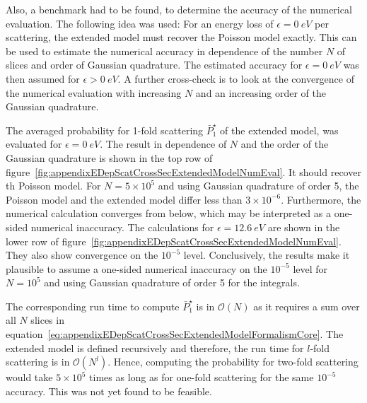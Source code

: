 Also, a benchmark had to be found, to determine the accuracy of the numerical evaluation. The following idea was used: For an energy loss of $\epsilon=\SI{0}{eV}$ per scattering, the extended model must recover the Poisson model exactly. This can be used to estimate the numerical accuracy in dependence of the number $N$ of slices and order of Gaussian quadrature. The estimated accuracy for $\epsilon=\SI{0}{eV}$ was then assumed for $\epsilon>\SI{0}{eV}$. A further cross-check is to look at the convergence of the numerical evaluation with increasing $N$ and an increasing order of the Gaussian quadrature.

The averaged probability for 1-fold scattering $\bar{P}^{\star}_1$ of the extended model, was evaluated for $\epsilon=\SI{0}{eV}$. The result in dependence of $N$ and the order of the Gaussian quadrature is shown in the top row of figure~\ref{fig:appendixEDepScatCrossSecExtendedModelNumEval}. It should recover th Poisson model. For $N=5\times10^5$ and using Gaussian quadrature of order 5, the Poisson model and the extended model differ less than $3\times10^{-6}$. Furthermore, the numerical calculation converges from below, which may be interpreted as a one-sided numerical inaccuracy. The calculations for $\epsilon=\SI{12.6}{eV}$ are shown in the lower row of figure~\ref{fig:appendixEDepScatCrossSecExtendedModelNumEval}. They also show convergence on the $10^{-5}$ level. Conclusively, the results make it plausible to assume a one-sided numerical inaccuracy on the $10^{-5}$ level for $N=10^5$ and using Gaussian quadrature of order 5 for the integrals.

The corresponding run time to compute $\bar{P}^{\star}_1$ is in $\mathcal{O}(N)$ as it requires a sum over all $N$ slices in equation~\ref{eq:appendixEDepScatCrossSecExtendedModelFormalismCore}. The extended model is defined recursively and therefore, the run time for $l$-fold scattering is in $\mathcal{O}(N^l)$. Hence, computing the probability for two-fold scattering would take $5\times10^5$ times as long as for one-fold scattering for the same $10^{-5}$ accuracy. This was not yet found to be feasible.
\FloatBarrier